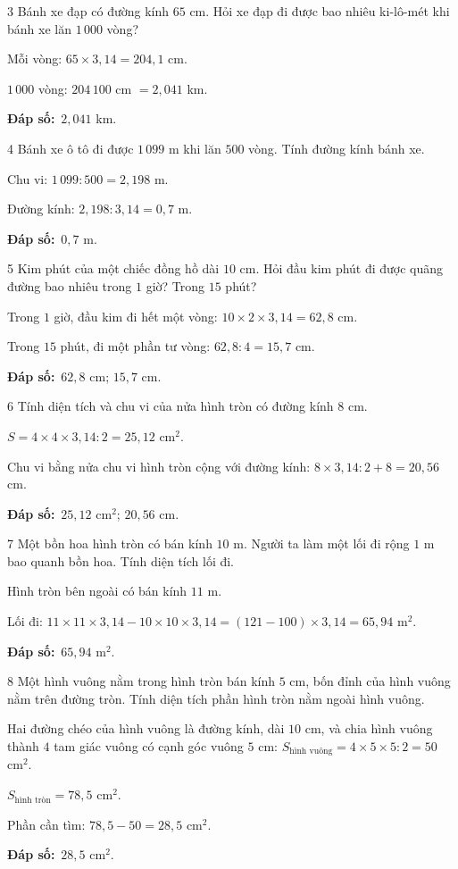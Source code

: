\documentclass[11pt]{article}
\newif\ifsol \solfalse
\providecommand{\AnsWord}{Đáp số}
\newcommand{\dapso}[1]{\par\textbf{\AnsWord:}\ #1}
\newcommand{\probsol}[1]{%
  \begin{lrbox}{\solmeasure}\begin{minipage}{\dimexpr\linewidth-24pt\relax}#1\end{minipage}\end{lrbox}%
  \ifsol
    \begin{solbox}#1\end{solbox}%
  \else
    \setlength{\solht}{\dimexpr\ht\solmeasure+\dp\solmeasure+0.85cm\relax}%
    \ifdim\solht<1.35cm\setlength{\solht}{1.35cm}\fi
    \begin{tcolorbox}[colback=white,colframe=Line,boxrule=0.8pt,arc=5pt,
      left=8pt,right=8pt,top=4pt,bottom=4pt,height=\solht]{\footnotesize\color{Slate}\itshape\WorkWord}\end{tcolorbox}%
  \fi}
\newcommand{\gap}{\vspace{0.3cm}}
\def\WorkWord{Bài làm:}
\def\AnsWord{Đáp số}
\begin{document}
\gap
\begin{probbox}{3}{\relax}
Bánh xe đạp có đường kính $65$ cm. Hỏi xe đạp đi được bao nhiêu ki-lô-mét khi bánh xe lăn $1\,000$ vòng?
\end{probbox}
\probsol{
Mỗi vòng: $65\times3{,}14=204{,}1$ cm.\par $1\,000$ vòng: $204\,100$ cm $=2{,}041$ km.
\dapso{$2{,}041$ km.}}
\gap
\begin{probbox}{4}{\relax}
Bánh xe ô tô đi được $1\,099$ m khi lăn $500$ vòng. Tính đường kính bánh xe.
\end{probbox}
\probsol{
Chu vi: $1\,099:500=2{,}198$ m.\par Đường kính: $2{,}198:3{,}14=0{,}7$ m.
\dapso{$0{,}7$ m.}}
\gap
\begin{probbox}{5}{\relax}
Kim phút của một chiếc đồng hồ dài $10$ cm. Hỏi đầu kim phút đi được quãng đường bao nhiêu trong $1$ giờ? Trong $15$ phút?
\end{probbox}
\probsol{
Trong $1$ giờ, đầu kim đi hết một vòng: $10\times2\times3{,}14=62{,}8$ cm.\par Trong $15$ phút, đi một phần tư vòng: $62{,}8:4=15{,}7$ cm.
\dapso{$62{,}8$ cm; $15{,}7$ cm.}}
\gap
\begin{probbox}{6}{\relax}
Tính diện tích và chu vi của nửa hình tròn có đường kính $8$ cm.
\end{probbox}
\probsol{
$S=4\times4\times3{,}14:2=25{,}12$ cm$^2$.\par Chu vi bằng nửa chu vi hình tròn cộng với đường kính: $8\times3{,}14:2+8=20{,}56$ cm.
\dapso{$25{,}12$ cm$^2$; $20{,}56$ cm.}}
\gap
\begin{probbox}{7}{\relax}
Một bồn hoa hình tròn có bán kính $10$ m. Người ta làm một lối đi rộng $1$ m bao quanh bồn hoa. Tính diện tích lối đi.
\end{probbox}
\probsol{
Hình tròn bên ngoài có bán kính $11$ m.\par Lối đi: $11\times11\times3{,}14-10\times10\times3{,}14=(121-100)\times3{,}14=65{,}94$ m$^2$.
\dapso{$65{,}94$ m$^2$.}}
\gap
\begin{probbox}{8}{\relax}
Một hình vuông nằm trong hình tròn bán kính $5$ cm, bốn đỉnh của hình vuông nằm trên đường tròn. Tính diện tích phần hình tròn nằm ngoài hình vuông.
\end{probbox}
\probsol{
Hai đường chéo của hình vuông là đường kính, dài $10$ cm, và chia hình vuông thành $4$ tam giác vuông có cạnh góc vuông $5$ cm: $S_\text{hình vuông}=4\times5\times5:2=50$ cm$^2$.\par
$S_\text{hình tròn}=78{,}5$ cm$^2$.\par Phần cần tìm: $78{,}5-50=28{,}5$ cm$^2$.
\dapso{$28{,}5$ cm$^2$.}}
\end{document}
